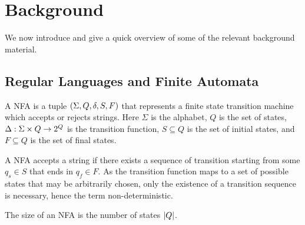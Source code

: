 
\section{Background}

We now introduce and give a quick overview of some of the relevant
background material.


\subsection{Regular Languages and Finite Automata}


A NFA is a tuple
\(\left(\Sigma, Q, \delta, S, F\right)\)
that represents a finite state transition machine
which accepts or rejects strings.
Here \(\Sigma\) is the alphabet,
\(Q\) is the set of states,
\(\Delta : \Sigma \times Q \to 2^{Q}\) is the transition function,
\(S \subseteq Q\) is the set of initial states,
and \(F \subseteq Q\) is the set of final states.

A NFA accepts a string if there exists a sequence of transition
starting from some \(q_s \in S\)
that ends in \(q_f \in F\).
As the transition function maps to a set of possible states that may
be arbitrarily chosen,
only the existence of a transition sequence is necessary,
hence the term non-deterministic.

The size of an NFA is the number of states \(\left\lvert Q\right\rvert\).

